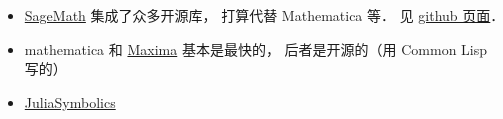
\begin{issues}
\issueDraft
\end{issues}

\begin{itemize}
\item \href{https://www.sagemath.org/}{SageMath} 集成了众多开源库， 打算代替 Mathematica 等． 见 \href{https://github.com/sagemath/sage/}{github 页面}．
\item mathematica 和 \href{https://maxima.sourceforge.io/}{Maxima} 基本是最快的， 后者是开源的（用 Common Lisp 写的）
\item \href{https://juliasymbolics.org/}{JuliaSymbolics}
\end{itemize}
